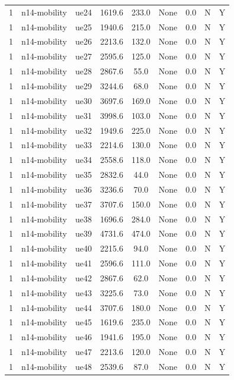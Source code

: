 \begin{table}[ht]
\begin{tabular}{|c|c|c|c|c|c|c|c|c|}
1 & n14-mobility & ue24 & 1619.6 & 233.0 & None & 0.0 & N & Y \\
1 & n14-mobility & ue25 & 1940.6 & 215.0 & None & 0.0 & N & Y \\
1 & n14-mobility & ue26 & 2213.6 & 132.0 & None & 0.0 & N & Y \\
1 & n14-mobility & ue27 & 2595.6 & 125.0 & None & 0.0 & N & Y \\
1 & n14-mobility & ue28 & 2867.6 & 55.0 & None & 0.0 & N & Y \\
1 & n14-mobility & ue29 & 3244.6 & 68.0 & None & 0.0 & N & Y \\
1 & n14-mobility & ue30 & 3697.6 & 169.0 & None & 0.0 & N & Y \\
1 & n14-mobility & ue31 & 3998.6 & 103.0 & None & 0.0 & N & Y \\
1 & n14-mobility & ue32 & 1949.6 & 225.0 & None & 0.0 & N & Y \\
1 & n14-mobility & ue33 & 2214.6 & 130.0 & None & 0.0 & N & Y \\
1 & n14-mobility & ue34 & 2558.6 & 118.0 & None & 0.0 & N & Y \\
1 & n14-mobility & ue35 & 2832.6 & 44.0 & None & 0.0 & N & Y \\
1 & n14-mobility & ue36 & 3236.6 & 70.0 & None & 0.0 & N & Y \\
1 & n14-mobility & ue37 & 3707.6 & 150.0 & None & 0.0 & N & Y \\
1 & n14-mobility & ue38 & 1696.6 & 284.0 & None & 0.0 & N & Y \\
1 & n14-mobility & ue39 & 4731.6 & 474.0 & None & 0.0 & N & Y \\
1 & n14-mobility & ue40 & 2215.6 & 94.0 & None & 0.0 & N & Y \\
1 & n14-mobility & ue41 & 2596.6 & 111.0 & None & 0.0 & N & Y \\
1 & n14-mobility & ue42 & 2867.6 & 62.0 & None & 0.0 & N & Y \\
1 & n14-mobility & ue43 & 3225.6 & 73.0 & None & 0.0 & N & Y \\
1 & n14-mobility & ue44 & 3707.6 & 180.0 & None & 0.0 & N & Y \\
1 & n14-mobility & ue45 & 1619.6 & 235.0 & None & 0.0 & N & Y \\
1 & n14-mobility & ue46 & 1941.6 & 195.0 & None & 0.0 & N & Y \\
1 & n14-mobility & ue47 & 2213.6 & 120.0 & None & 0.0 & N & Y \\
1 & n14-mobility & ue48 & 2539.6 & 87.0 & None & 0.0 & N & Y \\

\end{tabular}
\end{table}
